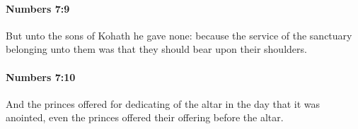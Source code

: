		\paragraph{Numbers 7:9} %
			\label{NUMBERS-7-9}

			But unto the sons of Kohath he gave none: because the service of the sanctuary belonging unto them was that they should bear upon their shoulders.


		\paragraph{Numbers 7:10} %
			\label{NUMBERS-7-10}

			And the princes offered for dedicating of the altar in the day that it was anointed, even the princes offered their offering before the altar.


